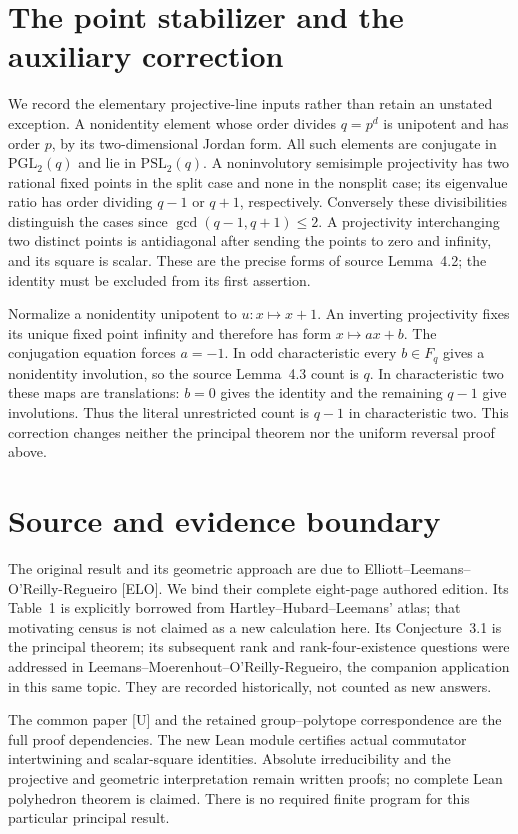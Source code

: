 \documentclass[11pt,a4paper]{article}
\begin{document}
\section{The point stabilizer and the auxiliary correction}
We record the elementary projective-line inputs rather than retain an
unstated exception. A nonidentity element whose order divides $q=p^d$
is unipotent and has order $p$, by its two-dimensional Jordan form.
All such elements are conjugate in $\mathrm{PGL}_2(q)$ and lie in
$\mathrm{PSL}_2(q)$. A noninvolutory semisimple projectivity has two
rational fixed points in the split case and none in the nonsplit case;
its eigenvalue ratio has order dividing $q-1$ or $q+1$, respectively.
Conversely these divisibilities distinguish the cases since
$\gcd(q-1,q+1)\le2$. A projectivity interchanging two distinct points
is antidiagonal after sending the points to zero and infinity, and its
square is scalar. These are the precise forms of source Lemma~4.2;
the identity must be excluded from its first assertion.

Normalize a nonidentity unipotent to $u:x\mapsto x+1$.
An inverting projectivity fixes its unique fixed point infinity and
therefore has form $x\mapsto ax+b$. The conjugation equation forces
$a=-1$. In odd characteristic every $b\in F_q$ gives a nonidentity
involution, so the source Lemma~4.3 count is $q$. In characteristic two
these maps are translations: $b=0$ gives the identity and the remaining
$q-1$ give involutions. Thus the literal unrestricted count is $q-1$
in characteristic two. This correction changes neither the principal
theorem nor the uniform reversal proof above.

\section{Source and evidence boundary}
The original result and its geometric approach are due to
Elliott--Leemans--O'Reilly-Regueiro [ELO]. We bind their complete
eight-page authored edition. Its Table~1 is explicitly borrowed from
Hartley--Hubard--Leemans' atlas; that motivating census is not claimed
as a new calculation here. Its Conjecture~3.1 is the principal theorem;
its subsequent rank and rank-four-existence questions were addressed in
Leemans--Moerenhout--O'Reilly-Regueiro, the companion application in this
same topic. They are recorded historically, not counted as new answers.

The common paper [U] and the retained group--polytope correspondence
are the full proof dependencies. The new Lean module certifies actual
commutator intertwining and scalar-square identities. Absolute
irreducibility and the projective and geometric interpretation remain
written proofs; no complete Lean polyhedron theorem is claimed.
There is no required finite program for this particular principal result.
\end{document}
